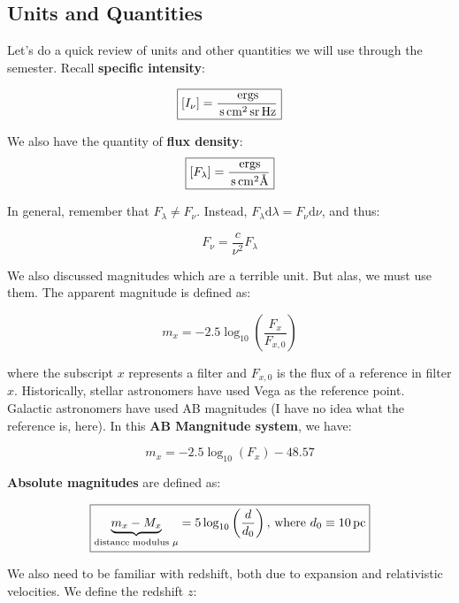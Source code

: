 \documentclass{article}
\newcommand{\unit}[1]{{\,\rm #1}}
\newcommand{\pc}{\unit{pc}}
\newcommand{\A}{\si{\angstrom}}
\begin{document}
\subsection{Units and Quantities}

Let's do a quick review of units and other quantities we will use through the semester. Recall \textbf{specific intensity}:

\begin{equation}
    \boxed{[I_\nu] = \frac{\unit{ergs}}{\unit{s} \unit{cm}^2 \unit{sr} \unit{Hz}}}
\end{equation}

We also have the quantity of \textbf{flux density}:
\begin{equation}
    \boxed{[F_\lambda] = \frac{\unit{ergs}}{\unit{s} \unit{cm}^2 \A}}
\end{equation}

In general, remember that $F_\lambda \neq F_\nu$. Instead, $F_\lambda \mathrm{d}\lambda = F_\nu \mathrm{d}\nu$, and thus:

\begin{equation}
    F_\nu = \frac{c}{\nu^2}F_\lambda
\end{equation}

We also discussed magnitudes which are a terrible unit. But alas, we must use them. The apparent magnitude is defined as:

\begin{equation}
    m_x = -2.5\log_{10}\left(\frac{F_x}{F_{x,0}}\right)
\end{equation}

where the subscript $x$ represents a filter and $F_{x,0}$ is the flux of a reference in filter $x$. Historically, stellar astronomers have used Vega as the reference point. Galactic astronomers have used AB magnitudes (I have no idea what the reference is, here). In this \textbf{AB Mangnitude system}, we have:

\begin{equation}
    \boxed{m_x = -2.5\log_{10}\left(F_x\right) - 48.57}
\end{equation}

\textbf{Absolute magnitudes} are defined as:

\begin{equation}
    \boxed{\underbrace{m_x - M_x}_{\text{distance modulus }\mu} =  5\log_{10}\left(\frac{d}{d_{0}}\right)\text{, where } d_0 \equiv 10 \pc}
\end{equation}

We also need to be familiar with redshift, both due to expansion and relativistic velocities. We define the redshift $z$:
\end{document}
